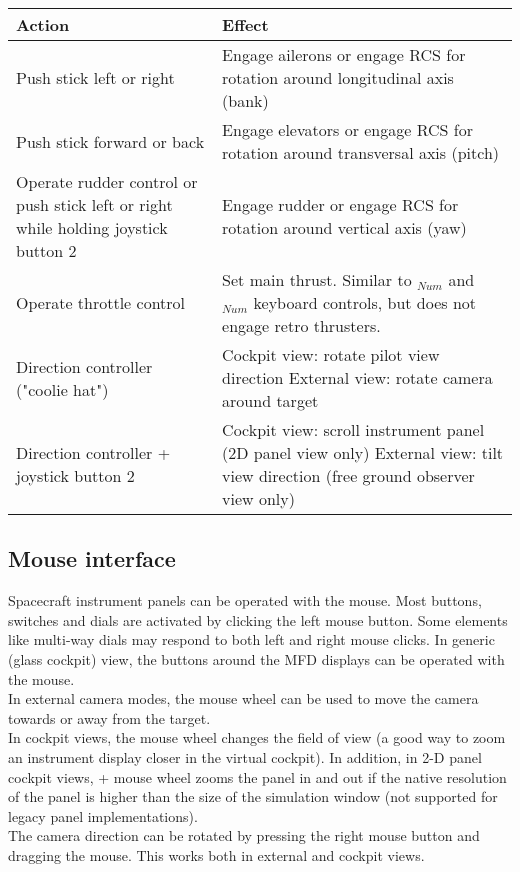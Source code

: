 \documentclass[Orbiter User Manual.tex]{subfiles}
\begin{document}
	\begin{longtable}{ |p{}|p{}| }
	\hline\rule{0pt}{2ex}
	\textbf{Action} & \textbf{Effect}\\
	\hline\rule{0pt}{2ex}
	Push stick left or right & Engage ailerons or engage RCS for rotation around longitudinal axis (bank)\\
	\hline\rule{0pt}{2ex}
	Push stick forward or back & Engage elevators or engage RCS for rotation around transversal axis (pitch)\\
	\hline\rule{0pt}{2ex}
	Operate rudder control or push stick left or right while holding joystick button 2 & Engage rudder or engage RCS for rotation around vertical axis (yaw)\\
	\hline\rule{0pt}{2ex}
	Operate throttle control & Set main thrust. Similar to \Ctrl\keystroke{+}$_{Num}$ and \Ctrl\keystroke{-}$_{Num}$ keyboard controls, but does not engage retro thrusters.\\
	\hline\rule{0pt}{2ex}
	Direction controller ("coolie hat") & Cockpit view: rotate pilot view direction\newline
	External view: rotate camera around target\\
	\hline\rule{0pt}{2ex}
	Direction controller + joystick button 2 & Cockpit view: scroll instrument panel (2D panel view only)\newline
	External view: tilt view direction (free ground observer view only)\\
	\hline
	\end{longtable}


\subsection{Mouse interface}
Spacecraft instrument panels can be operated with the mouse. Most buttons, switches and dials are activated by clicking the left mouse button. Some elements like multi-way dials may respond to both left and right mouse clicks. In generic (glass cockpit) view, the buttons around the MFD displays can be operated with the mouse.\\
In external camera modes, the mouse wheel can be used to move the camera towards or away from the target.\\
In cockpit views, the mouse wheel changes the field of view (a good way to zoom an instrument display closer in the virtual cockpit). In addition, in 2-D panel cockpit views, \Ctrl + mouse wheel zooms the panel in and out if the native resolution of the panel is higher than the size of the simulation window (not supported for legacy panel implementations).\\
The camera direction can be rotated by pressing the right mouse button and dragging the mouse. This works both in external and cockpit views.
\end{document}
